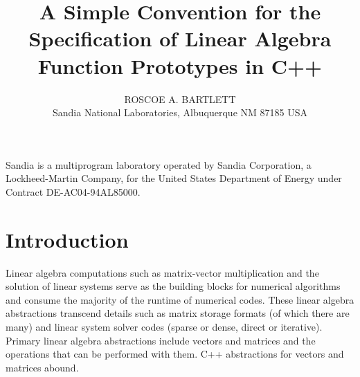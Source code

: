 \documentclass[acmtoms,acmnow]{acmtrans2m}
\title{
A Simple Convention for the Specification of Linear Algebra Function
Prototypes in C++ }
\author{
ROSCOE A. BARTLETT \\
Sandia National Laboratories, Albuquerque NM 87185 USA}
\begin{document}
            
\begin{bottomstuff} 
Sandia is a multiprogram laboratory operated by Sandia Corporation, a
Lockheed-Martin Company, for the United States Department of Energy
under Contract DE-AC04-94AL85000.
\end{bottomstuff}
            
\maketitle

\section{Introduction}

Linear algebra computations such as matrix-vector multiplication and the
solution of linear systems serve as the building blocks for numerical
algorithms and consume the majority of the runtime of numerical codes.  These
linear algebra abstractions transcend details such as matrix storage formats
(of which there are many) and linear system solver codes (sparse or dense,
direct or iterative).  Primary linear algebra abstractions include vectors and
matrices and the operations that can be performed with them.  C++ abstractions
for vectors and matrices abound.
\end{document}
